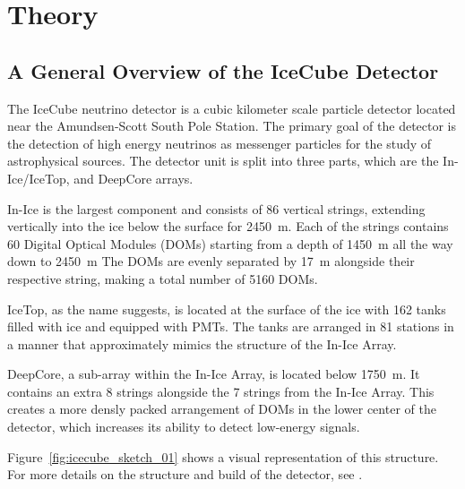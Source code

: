 \chapter{Theory}\label{chap:theory}

\section{A General Overview of the IceCube Detector}
The IceCube neutrino detector is a cubic kilometer scale particle detector located near the Amundsen-Scott South Pole Station. The primary goal of 
the detector is the detection of high energy neutrinos as messenger particles for the study of astrophysical sources. The detector unit is split into three 
parts, which are the In-Ice/IceTop, and DeepCore arrays. 

In-Ice is the largest component and consists of 86 vertical strings, extending vertically into the ice below the surface for \SI{2450}{\metre}. 
Each of the strings contains 60 Digital Optical Modules (DOMs) starting from a depth of \SI{1450}{\metre} all the way down to \SI{2450}{\metre}
The DOMs are evenly separated by \SI{17}{\metre} alongside their respective string, making a total number of \num{5160} DOMs. 

IceTop, as the name suggests, is located at the surface of the ice with \num{162} tanks filled with ice and equipped with PMTs. 
The tanks are arranged in 81 stations in a manner that approximately mimics the structure of the In-Ice Array. 

DeepCore, a sub-array within the In-Ice Array, is located below \SI{1750}{\metre}. It contains an extra \num{8} strings alongside the 
\num{7} strings from the In-Ice Array. This creates a more densly packed arrangement of DOMs in the lower center of the detector, which increases its 
ability to detect low-energy signals. 

Figure~\ref{fig:icecube_sketch_01} shows a visual representation of this structure. For more details on the structure and build of the detector, see \cite{Aartsen_2017}.

